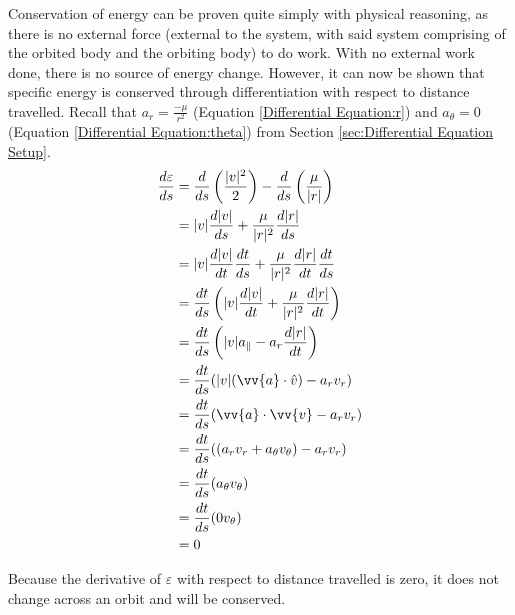 \documentclass{article}
\begin{document}
Conservation of energy can be proven quite simply with physical reasoning, as there is no external force (external to the system, with said system comprising of the orbited body and the orbiting body) to do work. With no external work done, there is no source of energy change. However, it can now be shown that specific energy is conserved through differentiation with respect to distance travelled. Recall that $a_r=\frac{-\mu}{r^2}$ (Equation \eqref{Differential Equation:r}) and $a_\theta=0$ (Equation \eqref{Differential Equation:theta}) from Section \ref{sec:Differential Equation Setup}.
\begin{align*}
    \frac{d\varepsilon}{ds} & =\frac{d}{ds}\left(\frac{|v|^2}{2}\right)-\frac{d}{ds}\left(\frac{\mu}{|r|}\right) \\
                            & =|v|\frac{d|v|}{ds}+\frac{\mu{}}{|r|^2}\frac{d|r|}{ds}                             \\
                            & =|v|\frac{d|v|}{dt}\frac{dt}{ds}+\frac{\mu{}}{|r|^2}\frac{d|r|}{dt}\frac{dt}{ds}   \\
                            & =\frac{dt}{ds}\left(|v|\frac{d|v|}{dt}+\frac{\mu{}}{|r|^2}\frac{d|r|}{dt}\right)   \\
                            & =\frac{dt}{ds}\left(|v|a_\parallel-a_r\frac{d|r|}{dt}\right)                       \\
                            & =\frac{dt}{ds}(|v|(\vv{a}\cdot\hat{v})-a_rv_r)                                     \\
                            & =\frac{dt}{ds}(\vv{a}\cdot\vv{v}-a_rv_r)                                           \\
                            & =\frac{dt}{ds}((a_rv_r+a_\theta{}v_\theta)-a_rv_r)                                 \\
                            & =\frac{dt}{ds}(a_\theta{}v_\theta)                                                 \\
                            & =\frac{dt}{ds}(0v_\theta)                                                          \\
                            & =0                                                                                 \\
\end{align*}

Because the derivative of $\varepsilon$ with respect to distance travelled is zero, it does not change across an orbit and will be conserved.
\end{document}
